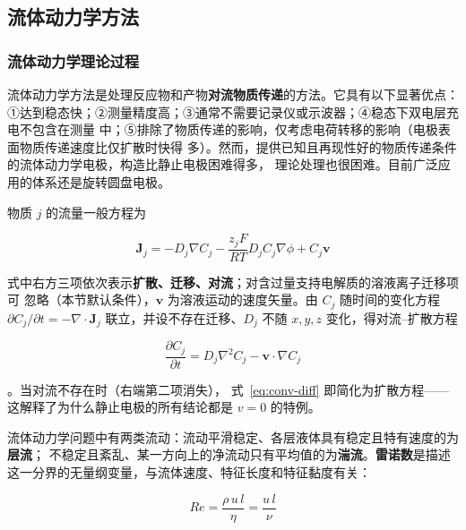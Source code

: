 \subsection{流体动力学方法}

\subsubsection{流体动力学理论过程}

流体动力学方法是处理反应物和产物\textbf{对流物质传递}的方法。它具有以下显著优点：
①达到稳态快；②测量精度高；③通常不需要记录仪或示波器；④稳态下双电层充电不包含在测量
中；⑤排除了物质传递的影响，仅考虑电荷转移的影响（电极表面物质传递速度比仅扩散时快得
多）。然而，提供已知且再现性好的物质传递条件的流体动力学电极，构造比静止电极困难得多，
理论处理也很困难。目前广泛应用的体系还是旋转圆盘电极。

物质 $j$ 的流量一般方程为

\begin{equation}
\boldsymbol{J}_j=-D_j\nabla C_j-\frac{z_jF}{RT}D_jC_j\nabla\phi+C_j\boldsymbol{v}
\label{eq:flux}
\end{equation}

式中右方三项依次表示\textbf{扩散、迁移、对流}；对含过量支持电解质的溶液离子迁移项可
忽略（本节默认条件），$\boldsymbol{v}$ 为溶液运动的速度矢量。由 $C_j$ 随时间的变化方程 $\partial C_j/\partial t=-\nabla\cdot\boldsymbol{J}_j$
联立，并设不存在迁移、$D_j$ 不随 $x,y,z$ 变化，得对流–扩散方程

\begin{equation}
\frac{\partial C_j}{\partial t}=D_j\nabla^{2}C_j
-\boldsymbol{v}\cdot\nabla C_j
\label{eq:conv-diff}
\end{equation}

。当对流不存在时（右端第二项消失），
式~\eqref{eq:conv-diff} 即简化为扩散方程——这解释了为什么静止电极的所有结论都是
$v=0$ 的特例。

流体动力学问题中有两类流动：流动平滑稳定、各层液体具有稳定且特有速度的为\textbf{层流}；
不稳定且紊乱、某一方向上的净流动只有平均值的为\textbf{湍流}。\textbf{雷诺数}是描述
这一分界的无量纲变量，与流体速度、特征长度和特征黏度有关：

\begin{equation}
Re=\frac{\rho\,u\,l}{\eta}=\frac{u\,l}{\nu}
\label{eq:re}
\end{equation}

